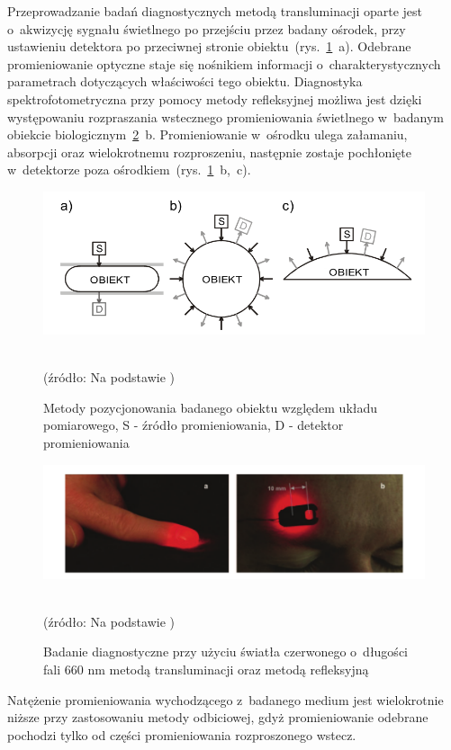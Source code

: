 Przeprowadzanie badań diagnostycznych metodą transluminacji oparte jest o~akwizycję sygnału świetlnego po przejściu przez badany ośrodek, przy ustawieniu detektora 
po przeciwnej stronie obiektu~(rys.~\ref{rys:position}~a). Odebrane promieniowanie optyczne staje się nośnikiem informacji o~charakterystycznych parametrach dotyczących 
właściwości tego obiektu. Diagnostyka spektrofotometryczna przy pomocy metody refleksyjnej możliwa jest dzięki występowaniu rozpraszania wstecznego promieniowania 
świetlnego w~badanym obiekcie biologicznym~\ref{rys:redlight}~b. Promieniowanie w~ośrodku ulega załamaniu, absorpcji oraz wielokrotnemu rozproszeniu, następnie zostaje 
pochłonięte w~detektorze poza ośrodkiem~(rys.~\ref{rys:position}~b,~c). 
\begin{figure}[!ht]
\centerline{\includegraphics[scale = 0.50]{graphic/position.png}}
	\caption{Metody pozycjonowania badanego obiektu względem układu pomiarowego, S - źródło promieniowania, D - detektor promieniowania}
	\label{rys:position}
	~\\
	(źródło: Na podstawie \cite{Cys:2007})
\end{figure}
\begin{figure}[!ht]
\centerline{\includegraphics[scale = 0.52]{graphic/redlight.png}}
	\caption{Badanie diagnostyczne przy użyciu światła czerwonego o~długości fali 660 nm metodą transluminacji oraz metodą refleksyjną}
	~\\
	(źródło: Na podstawie \cite{Mann:2007})
	\label{rys:redlight}
\end{figure}

\noindent Natężenie promieniowania wychodzącego z~badanego medium jest wielokrotnie niższe przy zastosowaniu 
metody odbiciowej, gdyż promieniowanie odebrane pochodzi tylko od części promieniowania rozproszonego wstecz. 


